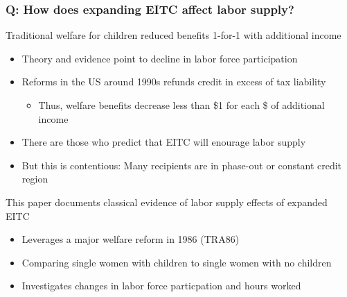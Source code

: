 \documentclass[aspectratio=169]{beamer}
\begin{document}
\begin{frame}
\frametitle{Q: How does expanding EITC affect labor supply?} 
Traditional welfare for children reduced benefits 1-for-1 with additional income
\begin{itemize}\setlength\itemsep{3pt}
 \item Theory and evidence point to decline in labor force participation
 \item Reforms in the US around 1990s refunds credit in excess of tax liability
\begin{itemize}\setlength\itemsep{3pt}
\item Thus, welfare benefits decrease less than \$1 for each \$ of additional income
\end{itemize}
\item There are those who predict that EITC will enourage labor supply
\item But this is contentious: Many recipients are in phase-out or constant credit region
\end{itemize}\medskip
This paper documents classical evidence of labor supply effects of expanded EITC
\begin{itemize}\setlength\itemsep{3pt}
  \item Leverages a major welfare reform in 1986 (TRA86)
  \item Comparing single women with children to single women with no children
  \item Investigates changes in labor force particpation and hours worked
  \end{itemize}
\end{frame}
\end{document}

